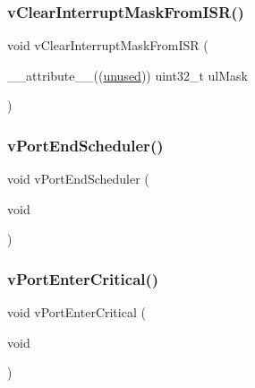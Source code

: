 \mbox{\label{thirdparty_2freertos_2freertos-10_80_80_2_source_2portable_2_g_c_c_2_a_r_m___c_m0_2port_8c_ad292bbba4a300536d7475e0ec48bb1ba}} 
\subsubsection{\texorpdfstring{vClearInterruptMaskFromISR()}{vClearInterruptMaskFromISR()}}
{\footnotesize\ttfamily void v\+Clear\+Interrupt\+Mask\+From\+I\+SR (\begin{DoxyParamCaption}\item[{\+\_\+\+\_\+attribute\+\_\+\+\_\+((\mbox{\hyperlink{group__group__sam0__utils_ga417dba7f63dde98dbebd6336d8af9d91}{unused}})) uint32\+\_\+t}]{ul\+Mask }\end{DoxyParamCaption})}

\mbox{\label{thirdparty_2freertos_2freertos-10_80_80_2_source_2portable_2_g_c_c_2_a_r_m___c_m0_2port_8c_af76f3c0b44c5b5c06fc046a4ee1a6423}} 
\subsubsection{\texorpdfstring{vPortEndScheduler()}{vPortEndScheduler()}}
{\footnotesize\ttfamily void v\+Port\+End\+Scheduler (\begin{DoxyParamCaption}\item[{void}]{ }\end{DoxyParamCaption})}

\mbox{\label{thirdparty_2freertos_2freertos-10_80_80_2_source_2portable_2_g_c_c_2_a_r_m___c_m0_2port_8c_a2ed3554a3de09a3bd09d396ee081ab69}} 
\subsubsection{\texorpdfstring{vPortEnterCritical()}{vPortEnterCritical()}}
{\footnotesize\ttfamily void v\+Port\+Enter\+Critical (\begin{DoxyParamCaption}\item[{void}]{ }\end{DoxyParamCaption})}

